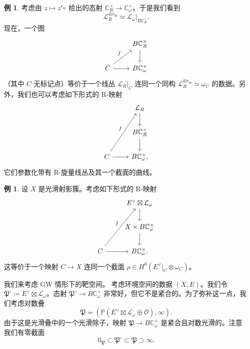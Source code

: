 \documentclass{amsart}
\theoremstyle{definition}
\newtheorem{exm}[thm]{例}
\theoremstyle{remark}
\theoremstyle{plain}
\theoremstyle{definition}
\theoremstyle{remark}
\newcommand{\C}{\mathbb{C}}
\renewcommand{\P}{\mathbb{P}}
\newcommand{\mc}[1]{\mathcal{#1}}
\newcommand{\mf}[1]{\mathfrak{#1}}
\newcommand{\mr}[1]{\mathrm{#1}}
\newcommand{\1}{\mathbf{1}}
\newcommand{\2}{\mathbf{2}}
\newcommand{\3}{\mathbf{3}}
\begin{document}
\begin{exm}
    考虑由 \(z \mapsto z^{r_{\mr{in}}}\) 给出的态射 \(\C^{\times}_R \to \C^{\times}_{\omega}\)。于是我们看到
    \[ \mc{L}_R^{\otimes r_{\mr{in}}} \simeq \mc{L}_{\omega} |_{B \C_R^{\times}}. \]
    现在，一个图
    \begin{equation*}
    \begin{tikzcd}
        & B \C_R^{\times} \ar{d} \\
        C \ar{ur}{f} \ar{r} & B \C_{\omega}^{\times}
    \end{tikzcd}
    \end{equation*}
    （其中 \(C\) 无标记点）等价于一个线丛 \(\mc{L}_R|_C\) 连同一个同构 \(\mc{L}_R^{\otimes r_{\mr{in}}} \simeq \omega_C\) 的数据。另外，我们也可以考虑如下形式的 R-映射
    \begin{equation*}
    \begin{tikzcd}
        & \mc{L}_R \ar{d} \\
        & B \C_R^{\times} \ar{d} \\
        C \ar{uur}{f} \ar{r} & B \C_{\omega}^{\times},
    \end{tikzcd}
    \end{equation*}
    它们参数化带有 R-旋量线丛及其一个截面的曲线。
\end{exm}

\begin{exm}
    设 \(X\) 是光滑射影簇。考虑如下形式的 R-映射
    \begin{equation*}
    \begin{tikzcd}
        & E^{\vee} \boxtimes \mc{L}_{\omega} \ar{d} \\
        & X \times B \C_{\omega}^{\times} \ar{d} \\
        C \ar{uur}{f} \ar{r} & B \C_{\omega}^{\times}.
    \end{tikzcd}
    \end{equation*}
    这等价于一个映射 \(C \to X\) 连同一个截面 \(\rho \in H^0(E^{\vee}|_C \otimes \omega_C)\)。
\end{exm}

我们来考虑 GW 情形下的靶空间。
考虑环境空间的数据 \((X, E)\)。我们令 \(\mf{P}^{\circ} \coloneqq E^{\vee} \boxtimes \mc{L}_{\omega}\)。态射 \(\mf{P}^{\circ} \to B \C_{\omega}^{\times}\) 非常好，但它不是紧合的。为了弥补这一点，我们考虑对数叠
\[ \mf{P} = ( \P(E^{\vee} \boxtimes \mc{L}_{\omega} \oplus \mc{O}) , \infty). \]
由于这是光滑叠中的一个光滑除子，映射 \(\mf{P} \to B \C_{\omega}^{\times}\) 是紧合且对数光滑的。注意我们有零截面
\[ 0_{\mf{P}} \subset \mf{P}^{\circ} \subset \mf{P} \supset \infty. \]
\end{document}
